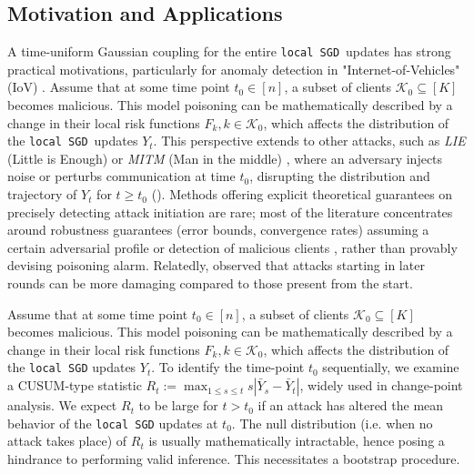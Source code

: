 \documentclass[a4paper,11pt]{article}
\numberwithin{equation}{section}
\theoremstyle{plain}
\theoremstyle{remark}
\newcommand{\DFL}{\texttt{local SGD}}
\begin{document}
\subsection{Motivation and Applications}\label{se:kmt-motivation}
A time-uniform Gaussian coupling for the entire \DFL\ updates has strong practical motivations, particularly for anomaly detection in "Internet-of-Vehicles" (IoV) \cite{shalev2017formal, ghimire2024, fluk2024}. Assume that at some time point \( t_0 \in [n] \), a subset of clients \( \mathcal{K}_0 \subseteq [K] \) becomes malicious.
This model poisoning can be mathematically described by a change in their local risk functions $F_k, k \in \mathcal{K}_0$, which affects the distribution of the \DFL\ updates $Y_t$. This perspective extends to other attacks, such as \textit{LIE} (Little is Enough) or \textit{MITM} (Man in the middle) \cite{shen2016, blanchard2017, bartlett2018, lie2019}, where an adversary injects noise or perturbs communication at time $t_0$, disrupting the distribution and trajectory of $Y_t$ for $t \geq t_0$ (\cite{ding2024identifying}). Methods offering explicit theoretical guarantees on precisely detecting attack initiation are rare; most of the literature concentrates around robustness guarantees (error bounds, convergence rates) assuming a certain adversarial profile or detection of malicious clients \citep{blanchard2017, Wang2020AttackTails, qian24b_byMI}, rather than provably devising poisoning alarm. Relatedly, \cite{Mapakshi2025TemporalAnalysis} observed that attacks starting in later rounds can be more damaging compared to those present from the start. 


Assume that at some time point \( t_0 \in [n] \), a subset of clients \( \mathcal{K}_0 \subseteq [K] \) becomes malicious.
This model poisoning can be mathematically described by a change in their local risk functions $F_k, k \in \mathcal{K}_0$, which affects the distribution of the \texttt{local SGD} updates $Y_t$. To identify the time-point $t_0$ sequentially, we examine a CUSUM-type statistic $R_{t}:=\max_{1\leq s \leq t}s|\bar{Y}_s -\bar{Y}_t|$, widely used in change-point analysis. We expect $R_{t}$ to be large for $t > t_0$ if an attack has altered the mean behavior of the \texttt{local SGD} updates at $t_0$. The null distribution (i.e. when no attack takes place) of $R_t$ is usually mathematically intractable, hence posing a hindrance to performing valid inference. This necessitates a bootstrap procedure. 
\end{document}
